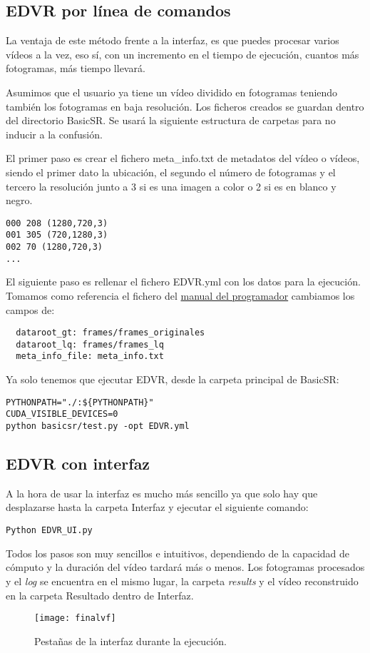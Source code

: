 \subsection{EDVR por línea de comandos}

La ventaja de este método frente a la interfaz, es que puedes procesar varios vídeos a la vez, eso sí, con un incremento en el tiempo de ejecución, cuantos más fotogramas, más tiempo llevará.

Asumimos que el usuario ya tiene un vídeo dividido en fotogramas teniendo también los fotogramas en baja resolución. Los ficheros creados se guardan dentro del directorio BasicSR. Se usará la siguiente estructura de carpetas para no inducir a la confusión.


El primer paso es crear el fichero meta\_info.txt de metadatos del vídeo o vídeos, siendo el primer dato la ubicación, el segundo el número de fotogramas y el tercero la resolución junto a 3 si es una imagen a color o 2 si es en blanco y negro.

\begin{verbatim}
000 208 (1280,720,3)
001 305 (720,1280,3)
002 70 (1280,720,3)
...
\end{verbatim}

El siguiente paso es rellenar el fichero EDVR.yml con los datos para la ejecución. Tomamos como referencia el fichero del  \hyperref[lis:yml]{manual del programador} cambiamos los campos de:
\begin{verbatim}
  dataroot_gt: frames/frames_originales
  dataroot_lq: frames/frames_lq
  meta_info_file: meta_info.txt
\end{verbatim}

Ya solo tenemos que ejecutar EDVR, desde la carpeta principal de BasicSR:

\begin{verbatim}
PYTHONPATH="./:${PYTHONPATH}"
CUDA_VISIBLE_DEVICES=0
python basicsr/test.py -opt EDVR.yml
\end{verbatim}

\subsection{EDVR con interfaz}

A la hora de usar la interfaz es mucho más sencillo ya que solo hay que desplazarse hasta la carpeta Interfaz y ejecutar el siguiente comando:

\begin{verbatim}
Python EDVR_UI.py
\end{verbatim}

Todos los pasos son muy sencillos e intuitivos, dependiendo de la capacidad de cómputo y la duración del vídeo tardará más o menos. Los fotogramas procesados y el \emph{log} se encuentra en el mismo lugar, la carpeta  \emph{results} y el vídeo reconstruido en la carpeta Resultado dentro de Interfaz.

\begin{figure}[!h]
		\centering
		\texttt{[image: finalvf]}
		\caption{Pestañas de la interfaz durante la ejecución.}\label{1}
	\end{figure}
	\FloatBarrier
